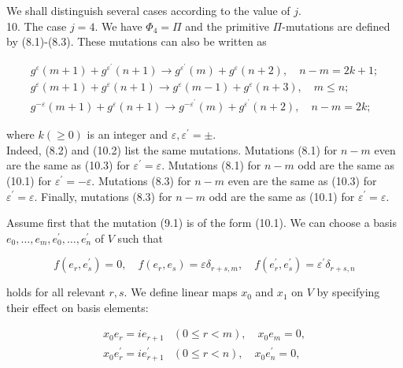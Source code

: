 \documentclass[10pt]{article}
\begin{document}
We shall distinguish several cases according to the value of $j$.\\
10. The case $j=4$. We have $\Phi_{4}=\Pi$ and the primitive $\Pi$-mutations are defined by (8.1)-(8.3). These mutations can also be written as


\begin{gather*}
g^{\varepsilon}(m+1)+g^{\varepsilon^{\prime}}(n+1) \rightarrow g^{\varepsilon^{\prime}}(m)+g^{\varepsilon}(n+2), \quad n-m=2 k+1 ;  \tag{10.1}\\
g^{\varepsilon}(m+1)+g^{\varepsilon}(n+1) \rightarrow g^{\varepsilon}(m-1)+g^{\varepsilon}(n+3), \quad m \leqslant n ;  \tag{10.2}\\
g^{-\varepsilon}(m+1)+g^{\varepsilon}(n+1) \rightarrow g^{-\varepsilon^{\prime}}(m)+g^{\varepsilon^{\prime}}(n+2), \quad n-m=2 k ; \tag{10.3}
\end{gather*}


where $k(\geqslant 0)$ is an integer and $\varepsilon, \varepsilon^{\prime}= \pm$.\\
Indeed, (8.2) and (10.2) list the same mutations. Mutations (8.1) for $n-m$ even are the same as (10.3) for $\varepsilon^{\prime}=\varepsilon$. Mutations (8.1) for $n-m$ odd are the same as (10.1) for $\varepsilon^{\prime}=-\varepsilon$. Mutations (8.3) for $n-m$ even are the same as (10.3) for $\varepsilon^{\prime}=\varepsilon$. Finally, mutations (8.3) for $n-m$ odd are the same as (10.1) for $\varepsilon^{\prime}=\varepsilon$.

Assume first that the mutation (9.1) is of the form (10.1). We can choose a basis $e_{0}, \ldots, e_{m}, e_{0}^{\prime}, \ldots, e_{n}^{\prime}$ of $V$ such that


\begin{equation*}
f\left(e_{r}, e_{s}^{\prime}\right)=0, \quad f\left(e_{r}, e_{s}\right)=\varepsilon \delta_{r+s, m}, \quad f\left(e_{r}^{\prime}, e_{s}^{\prime}\right)=\varepsilon^{\prime} \delta_{r+s, n} \tag{10.4}
\end{equation*}


holds for all relevant $r, s$. We define linear maps $x_{0}$ and $x_{1}$ on $V$ by specifying their effect on basis elements:

$$
\begin{array}{ll}
x_{0} e_{r}=i e_{r+1} & (0 \leqslant r<m), \quad x_{0} e_{m}=0, \\
x_{0} e_{r}^{\prime}=i e_{r+1}^{\prime} & (0 \leqslant r<n), \quad x_{0} e_{n}^{\prime}=0,
\end{array}
$$
\end{document}

